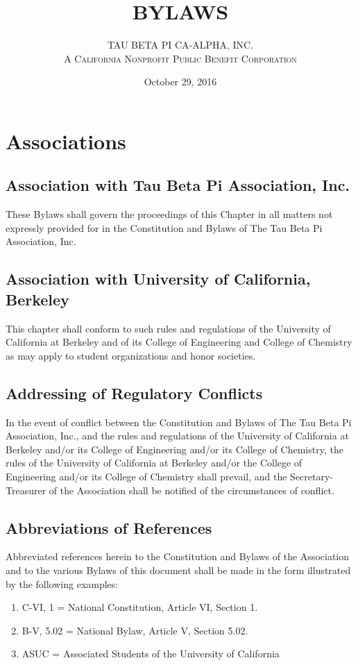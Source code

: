 \documentclass{article}
\begin{document}
	\title{\textbf {\uppercase{Bylaws}}}
	\author{\uppercase{Tau Beta Pi CA-Alpha, Inc.} \\ \textsc{A California Nonprofit Public Benefit Corporation}}
	\date{October 29, 2016}
	\maketitle
	\clearpage


	\section{Associations}
	\subsection{Association with Tau Beta Pi Association, Inc.}
	These Bylaws shall govern the proceedings of this Chapter in all matters not expressly provided for in the Constitution and Bylaws of The Tau Beta Pi Association, Inc.
	\subsection{Association with University of California, Berkeley}
	This chapter shall conform to such rules and regulations of the University of California at Berkeley and of its College of Engineering and College of Chemistry as may apply to student organizations and honor societies.
	\subsection{Addressing of Regulatory Conflicts}
	In the event of conflict between the Constitution and Bylaws of The Tau Beta Pi Association, Inc., and the rules and regulations of the University of California at Berkeley and/or its College of Engineering and/or its College of Chemistry, the rules of the University of California at Berkeley and/or the College of Engineering and/or its College of Chemistry shall prevail, and the Secretary- Treasurer of the Association shall be notified of the circumstances of conflict.
	\subsection{Abbreviations of References}
	Abbreviated references herein to the Constitution and Bylaws of the Association and to the various Bylaws of this document shall be made in the form illustrated by the following examples:
	\begin{enumerate}[\indent a)]
	\item C-VI, 1 = National Constitution, Article VI, Section 1. 
	\item B-V, 5.02 = National Bylaw, Article V, Section 5.02.
	\item ASUC = Associated Students of the University of California 
	\end{enumerate}
	
\end{document}
